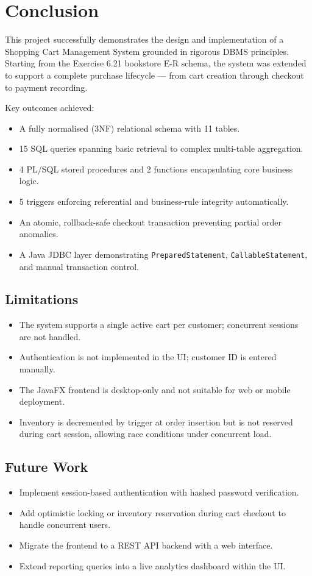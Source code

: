 \documentclass[12pt, a4paper]{article}
\begin{document}
\section{Conclusion}

This project successfully demonstrates the design and implementation of a Shopping
Cart Management System grounded in rigorous DBMS principles. Starting from the
Exercise 6.21 bookstore E-R schema, the system was extended to support a complete
purchase lifecycle — from cart creation through checkout to payment recording.

Key outcomes achieved:
\begin{itemize}
    \item A fully normalised (3NF) relational schema with 11 tables.
    \item 15 SQL queries spanning basic retrieval to complex multi-table aggregation.
    \item 4 PL/SQL stored procedures and 2 functions encapsulating core business logic.
    \item 5 triggers enforcing referential and business-rule integrity automatically.
    \item An atomic, rollback-safe checkout transaction preventing partial order anomalies.
    \item A Java JDBC layer demonstrating \texttt{PreparedStatement},
          \texttt{CallableStatement}, and manual transaction control.
\end{itemize}

\subsection{Limitations}
\begin{itemize}
    \item The system supports a single active cart per customer; concurrent
          sessions are not handled.
    \item Authentication is not implemented in the UI; customer ID is entered
          manually.
    \item The JavaFX frontend is desktop-only and not suitable for web
          or mobile deployment.
    \item Inventory is decremented by trigger at order insertion but is not
          reserved during cart session, allowing race conditions under
          concurrent load.
\end{itemize}

\subsection{Future Work}
\begin{itemize}
    \item Implement session-based authentication with hashed password
          verification.
    \item Add optimistic locking or inventory reservation during cart
          checkout to handle concurrent users.
    \item Migrate the frontend to a REST API backend with a web interface.
    \item Extend reporting queries into a live analytics dashboard within
          the UI.
\end{itemize}
\end{document}
